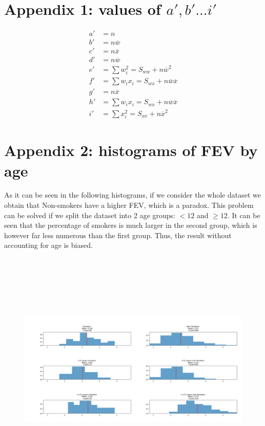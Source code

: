 \documentclass[a4paper]{article}
\begin{document}
\begin{appendix}
\section{Appendix 1: values of $a', b' ... i'$} 

\begin{equation*}
\begin{split}
	a' & = n \\
	b' & = n\overline{w} \\
	c' & = n\overline{x} \\
	d' & = n\overline{w} \\
	e' & = \sum{w_{i}^2} = S_{ww}+n\overline{w}^2 \\
	f' & = \sum{w_{i}x_{i}} = S_{wx} + n\overline{w}\overline{x} \\
	g' & = n\overline{x} \\
	h' & = \sum{w_{i}x_{i}} = S_{wx} + n\overline{w}\overline{x} \\
	i' & = \sum{x_{i}^2} = S_{xx}+n\overline{x}^2 
\end{split}
\end{equation*}

\newpage

\section{Appendix 2: histograms of FEV by age}
As it can be seen in the following histograms, if we consider the whole dataset we obtain that Non-smokers have a higher FEV, which is a paradox. This problem can be solved if we split the dataset into 2 age groups: $<12$ and $\geq12$. It can be seen that the percentage of smokers is much larger in the second group, which is however far less numerous than the first group. Thus, the result without accounting for age is biased.
\begin{figure}[h]
	\hspace{-19.0mm}
  	\includegraphics[width=150mm,height=115mm]{hist}	
\end{figure}

\end{appendix}
\end{document}
